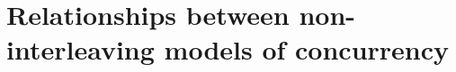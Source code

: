 \chapter{Relationships between non-interleaving models of concurrency}
\label{chap:Relationship with other models of true concurrency}





